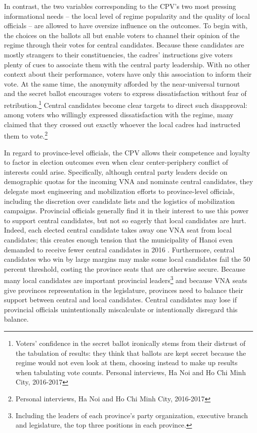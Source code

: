 \documentclass[12pt]{article}
\newcommand\fnote[1]{\footnote{\baselineskip=2\normalbaselineskip#1}}
\newcommand{\1}{\mathbbm{1}}
\begin{document}
In contrast, the two variables corresponding to the CPV's two most pressing informational needs -- the local level of regime popularity and the quality of local officials -- are allowed to have oversize influence on the outcomes. To begin with, the choices on the ballots all but enable voters to channel their opinion of the regime through their votes for central candidates. Because these candidates are mostly strangers to their constituencies, the cadres' instructions give voters plenty of cues to associate them with the central party leadership. With no other context about their performance, voters have only this association to inform their vote. At the same time, the anonymity afforded by the near-universal turnout and the secret ballot encourages voters to express dissatisfaction without fear of retribution.\fnote{Voters' confidence in the secret ballot ironically stems from their distrust of the tabulation of results: they think that ballots are kept secret because the regime would not even look at them, choosing instead to make up results when tabulating vote counts. Personal interviews, Ha Noi and Ho Chi Minh City, 2016-2017} Central candidates become clear targets to direct such disapproval: among voters who willingly expressed dissatisfaction with the regime, many claimed that they crossed out exactly whoever the local cadres had instructed them to vote.\fnote{Personal interviews, Ha Noi and Ho Chi Minh City, 2016-2017}

In regard to province-level officials, the CPV allows their competence and loyalty to factor in election outcomes even when clear center-periphery conflict of interests could arise. Specifically, although central party leaders decide on demographic quotas for the incoming VNA and nominate central candidates, they delegate most engineering and mobilization efforts to province-level officials, including the discretion over candidate lists and the logistics of mobilization campaigns. Provincial officials generally find it in their interest to use this power to support central candidates, but not so eagerly that local candidates are hurt. Indeed, each elected central candidate takes away one VNA seat from local candidates; this creates enough tension that the municipality of Hanoi even demanded to receive fewer central candidates in 2016 \citep{vnexpress2016_2}. Furthermore, central candidates who win by large margins may make some local candidates fail the 50 percent threshold, costing the province seats that are otherwise secure. Because many local candidates are important provincial leaders\fnote{Including the leaders of each province's party organization, executive branch and legislature, the top three positions in each province.} and because VNA seats give provinces representation in the legislature, provinces need to balance their support between central and local candidates. Central candidates may lose if provincial officials unintentionally miscalculate or intentionally disregard this balance.
\end{document}
